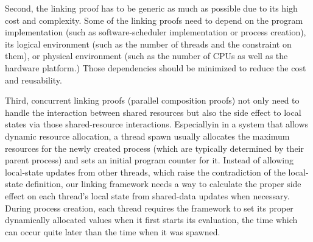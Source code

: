 Second,  
the linking proof has to be generic as much as possible due to its high cost and complexity. 
Some of the linking proofs need to depend
on the program implementation (such as software-scheduler implementation or process creation),
 its logical environment (such as the number of threads and the constraint on them),
 or physical environment (such as the number of CPUs as well as the hardware platform.)
Those dependencies should be minimized to reduce the cost and reusability. 

Third, 
concurrent linking proofs (parallel composition proofs) 
 not only need to handle the interaction between shared resources but also the side effect to local states via those shared-resource interactions. 
Especiallyin in a system that allows dynamic resource allocation,
a thread spawn usually allocates the maximum resources for the newly created process (which are typically determined by their parent process) and  sets an initial program counter for it.
Instead of allowing local-state updates from other threads, which raise the contradiction of the local-state definition, 
our linking framework needs a way to calculate the proper side effect on each thread's local state from shared-data updates when necessary. 
During process creation, each thread requires the framework to set its proper dynamically allocated values when it first starts its evaluation,
the time which can occur quite later than the time when it was spawned. 








